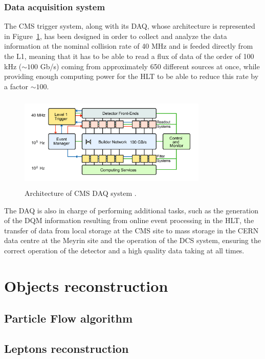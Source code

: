\documentclass[a4paper, 10pt, openright]{report}
\begin{document}
\subsection{Data acquisition system} \label{subsection:DAQ}

The CMS trigger system, along with its \acf{DAQ}, whose architecture is represented in Figure~\ref{fig:CMSDAQ}, has been designed in order to collect and analyze the data information at the nominal collision rate of 40 MHz and is feeded directly from the \acf{L1}, meaning that it has to be able to read a flux of data of the order of 100 kHz ($\sim 100$ Gb/s) coming from approximately 650 different sources at once, while providing enough computing power for the \ac{HLT} to be able to reduce this rate by a factor $\sim 100$.

\begin{figure}[htbp]
\begin{center}
\includegraphics[width=9cm, height=4.5cm]{figs/CMSDAQ.png}
\caption{Architecture of \ac{CMS} \acf{DAQ} system \cite{CMSDescription}.}
\label{fig:CMSDAQ}
\end{center}
\end{figure}

The \ac{DAQ} is also in charge of performing additional tasks, such as the generation of the \ac{DQM} information resulting
from online event processing in the \ac{HLT}, the transfer of data from local storage at the \ac{CMS} site to mass storage in the \ac{CERN} data centre at the Meyrin site and the operation of the \ac{DCS} system, ensuring the correct operation of the detector and a high quality data taking at all times.

\chapter{Objects reconstruction} \label{chapter:Reco}
\section{Particle Flow algorithm}
\section{Leptons reconstruction}
\end{document}
